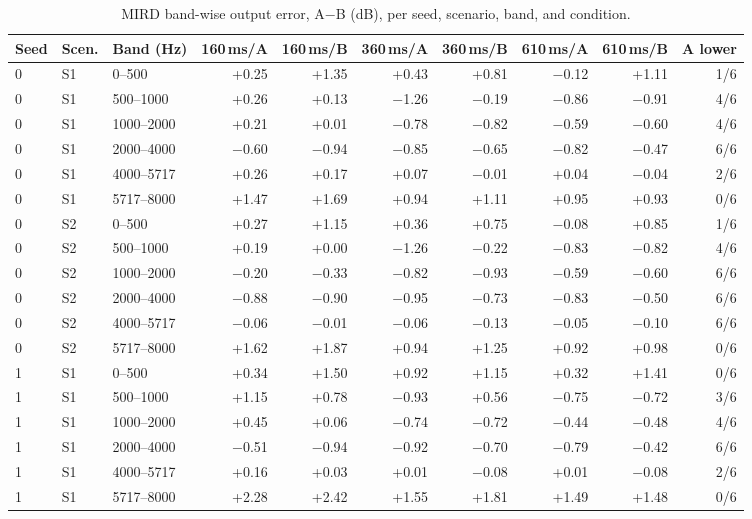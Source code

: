 \begin{longtable}{@{}lllrrrrrrr@{}}
\caption{MIRD band-wise output error, A$-$B (dB), per seed, scenario, band, and condition.}\label{tab:bands}\\
\toprule
Seed & Scen. & Band (Hz) & 160\,ms/A & 160\,ms/B & 360\,ms/A & 360\,ms/B & 610\,ms/A & 610\,ms/B & A lower \\
\midrule\endhead
0 & S1 & 0--500 & +0.25 & +1.35 & +0.43 & +0.81 & $-$0.12 & +1.11 & 1/6 \\
0 & S1 & 500--1000 & +0.26 & +0.13 & $-$1.26 & $-$0.19 & $-$0.86 & $-$0.91 & 4/6 \\
0 & S1 & 1000--2000 & +0.21 & +0.01 & $-$0.78 & $-$0.82 & $-$0.59 & $-$0.60 & 4/6 \\
0 & S1 & 2000--4000 & $-$0.60 & $-$0.94 & $-$0.85 & $-$0.65 & $-$0.82 & $-$0.47 & 6/6 \\
0 & S1 & 4000--5717 & +0.26 & +0.17 & +0.07 & $-$0.01 & +0.04 & $-$0.04 & 2/6 \\
0 & S1 & 5717--8000 & +1.47 & +1.69 & +0.94 & +1.11 & +0.95 & +0.93 & 0/6 \\
0 & S2 & 0--500 & +0.27 & +1.15 & +0.36 & +0.75 & $-$0.08 & +0.85 & 1/6 \\
0 & S2 & 500--1000 & +0.19 & +0.00 & $-$1.26 & $-$0.22 & $-$0.83 & $-$0.82 & 4/6 \\
0 & S2 & 1000--2000 & $-$0.20 & $-$0.33 & $-$0.82 & $-$0.93 & $-$0.59 & $-$0.60 & 6/6 \\
0 & S2 & 2000--4000 & $-$0.88 & $-$0.90 & $-$0.95 & $-$0.73 & $-$0.83 & $-$0.50 & 6/6 \\
0 & S2 & 4000--5717 & $-$0.06 & $-$0.01 & $-$0.06 & $-$0.13 & $-$0.05 & $-$0.10 & 6/6 \\
0 & S2 & 5717--8000 & +1.62 & +1.87 & +0.94 & +1.25 & +0.92 & +0.98 & 0/6 \\
1 & S1 & 0--500 & +0.34 & +1.50 & +0.92 & +1.15 & +0.32 & +1.41 & 0/6 \\
1 & S1 & 500--1000 & +1.15 & +0.78 & $-$0.93 & +0.56 & $-$0.75 & $-$0.72 & 3/6 \\
1 & S1 & 1000--2000 & +0.45 & +0.06 & $-$0.74 & $-$0.72 & $-$0.44 & $-$0.48 & 4/6 \\
1 & S1 & 2000--4000 & $-$0.51 & $-$0.94 & $-$0.92 & $-$0.70 & $-$0.79 & $-$0.42 & 6/6 \\
1 & S1 & 4000--5717 & +0.16 & +0.03 & +0.01 & $-$0.08 & +0.01 & $-$0.08 & 2/6 \\
1 & S1 & 5717--8000 & +2.28 & +2.42 & +1.55 & +1.81 & +1.49 & +1.48 & 0/6 \\

\end{longtable}
